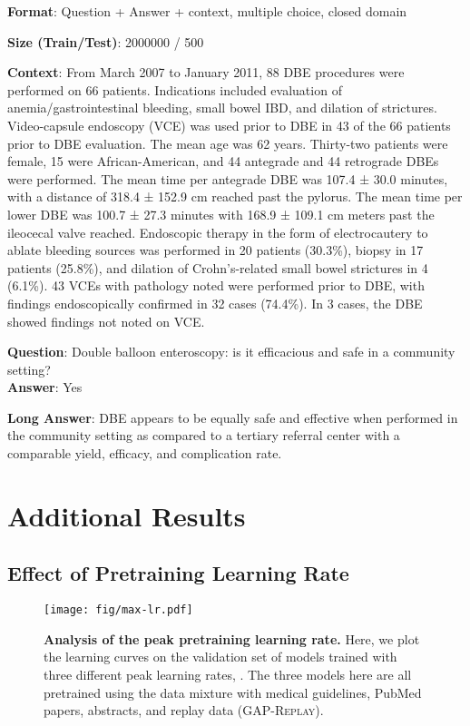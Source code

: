 \documentclass{article}
\begin{document}
\begin{myboxnote}[PubMedQA]

    \textbf{Format}: Question + Answer + context, multiple choice, closed domain 
    
    \textbf{Size (Train/Test)}: 2000000 / 500 

    \tcblower
    
    \textbf{Context}: From March 2007 to January 2011, 88 DBE procedures were performed on 66 patients. Indications included evaluation of anemia/gastrointestinal bleeding, small bowel IBD, and dilation of strictures. Video-capsule endoscopy (VCE) was used prior to DBE in 43 of the 66 patients prior to DBE evaluation. The mean age was 62 years. Thirty-two patients were female, 15 were African-American, and 44 antegrade and 44 retrograde DBEs were performed. The mean time per antegrade DBE was 107.4 ± 30.0 minutes, with a distance of 318.4 ± 152.9 cm reached past the pylorus. The mean time per lower DBE was 100.7 ± 27.3 minutes with 168.9 ± 109.1 cm meters past the ileocecal valve reached. Endoscopic therapy in the form of electrocautery to ablate bleeding sources was performed in 20 patients (30.3\%), biopsy in 17 patients (25.8\%), and dilation of Crohn’s-related small bowel strictures in 4 (6.1\%). 43 VCEs with pathology noted were performed prior to DBE, with findings endoscopically confirmed in 32 cases (74.4\%). In 3 cases, the DBE showed findings not noted on VCE.
    
    \textbf{Question}: Double balloon enteroscopy: is it efficacious and safe in a community setting? \\
    
    \textbf{Answer}: Yes 
    
    \textbf{Long Answer}: DBE appears to be equally safe and effective when performed in the community setting as compared to a tertiary referral center with a comparable yield, efficacy, and complication rate.
\end{myboxnote}

\section{Additional Results}

\subsection{Effect of Pretraining Learning Rate}

\begin{figure}[h]
    \centering
    \texttt{[image: fig/max-lr.pdf]}
    \caption{\textbf{Analysis of the peak pretraining learning rate.} Here, we plot the learning curves on the validation set of models trained with three different peak learning rates, . The three models here are all pretrained using the data mixture with medical guidelines, PubMed papers, abstracts, and replay data (\textsc{GAP-Replay}).}
    \label{fig:max-lr}
\end{figure}
\end{document}
